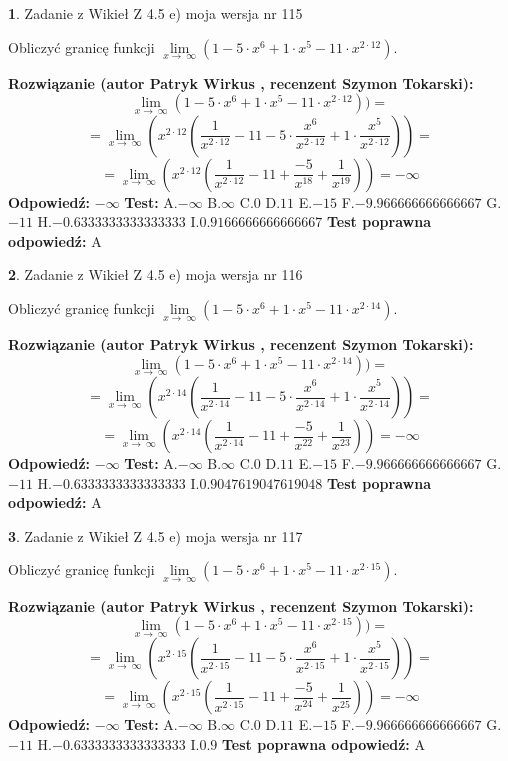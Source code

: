 \documentclass[12pt, a4paper]{article}
\theoremstyle{definition} %
\newtheorem{zad}{}
\newcommand{\zadStart}[1]{\begin{zad}#1\newline}
\newcommand{\zadStop}{\end{zad}}
\newcommand{\rozwStart}[2]{\noindent \textbf{Rozwiązanie (autor #1 , recenzent #2): }\newline}
\newcommand{\rozwStop}{\newline}
\newcommand{\odpStart}{\noindent \textbf{Odpowiedź:}\newline}
\newcommand{\odpStop}{\newline}
\newcommand{\testStart}{\noindent \textbf{Test:}\newline}
\newcommand{\testStop}{\newline}
\newcommand{\kluczStart}{\noindent \textbf{Test poprawna odpowiedź:}\newline}
\newcommand{\kluczStop}{\newline}
\begin{document}
\zadStart{Zadanie z Wikieł Z 4.5 e) moja wersja nr 115}


Obliczyć granicę funkcji  $\lim\limits_{x\to\ \infty}(1 - 5 \cdot x^{6}+1 \cdot x^{5}- 11 \cdot x^{2\cdot12})$.
\zadStop
\rozwStart{Patryk Wirkus}{Szymon Tokarski}
$$\lim\limits_{x\to\ \infty}(1 - 5 \cdot x^{6}+1 \cdot x^{5}- 11 \cdot x^{2\cdot12}))=$$
$$=\lim\limits_{x\to\ \infty}(x^{2\cdot12}(\frac{1}{x^{2\cdot12}}-11 -5 \cdot \frac{x^{6}}{x^{2\cdot12}}+1 \cdot \frac{x^{5}}{x^{2\cdot12}}))=$$
$$=\lim\limits_{x\to\ \infty}(x^{2\cdot12}(\frac{1}{x^{2\cdot12}}-11 + \frac{-5}{x^{18}}+ \frac{1}{x^{19}}))=-\infty$$
\rozwStop
\odpStart
$-\infty$
\odpStop
\testStart
A.$-\infty$ B.$\infty$ C.$0$ D.$11$ E.$-15$
F.$-9.966666666666667$ G.$-11$
H.$-0.6333333333333333$
I.$0.9166666666666667$
\testStop
\kluczStart
A
\kluczStop



\zadStart{Zadanie z Wikieł Z 4.5 e) moja wersja nr 116}


Obliczyć granicę funkcji  $\lim\limits_{x\to\ \infty}(1 - 5 \cdot x^{6}+1 \cdot x^{5}- 11 \cdot x^{2\cdot14})$.
\zadStop
\rozwStart{Patryk Wirkus}{Szymon Tokarski}
$$\lim\limits_{x\to\ \infty}(1 - 5 \cdot x^{6}+1 \cdot x^{5}- 11 \cdot x^{2\cdot14}))=$$
$$=\lim\limits_{x\to\ \infty}(x^{2\cdot14}(\frac{1}{x^{2\cdot14}}-11 -5 \cdot \frac{x^{6}}{x^{2\cdot14}}+1 \cdot \frac{x^{5}}{x^{2\cdot14}}))=$$
$$=\lim\limits_{x\to\ \infty}(x^{2\cdot14}(\frac{1}{x^{2\cdot14}}-11 + \frac{-5}{x^{22}}+ \frac{1}{x^{23}}))=-\infty$$
\rozwStop
\odpStart
$-\infty$
\odpStop
\testStart
A.$-\infty$ B.$\infty$ C.$0$ D.$11$ E.$-15$
F.$-9.966666666666667$ G.$-11$
H.$-0.6333333333333333$
I.$0.9047619047619048$
\testStop
\kluczStart
A
\kluczStop



\zadStart{Zadanie z Wikieł Z 4.5 e) moja wersja nr 117}


Obliczyć granicę funkcji  $\lim\limits_{x\to\ \infty}(1 - 5 \cdot x^{6}+1 \cdot x^{5}- 11 \cdot x^{2\cdot15})$.
\zadStop
\rozwStart{Patryk Wirkus}{Szymon Tokarski}
$$\lim\limits_{x\to\ \infty}(1 - 5 \cdot x^{6}+1 \cdot x^{5}- 11 \cdot x^{2\cdot15}))=$$
$$=\lim\limits_{x\to\ \infty}(x^{2\cdot15}(\frac{1}{x^{2\cdot15}}-11 -5 \cdot \frac{x^{6}}{x^{2\cdot15}}+1 \cdot \frac{x^{5}}{x^{2\cdot15}}))=$$
$$=\lim\limits_{x\to\ \infty}(x^{2\cdot15}(\frac{1}{x^{2\cdot15}}-11 + \frac{-5}{x^{24}}+ \frac{1}{x^{25}}))=-\infty$$
\rozwStop
\odpStart
$-\infty$
\odpStop
\testStart
A.$-\infty$ B.$\infty$ C.$0$ D.$11$ E.$-15$
F.$-9.966666666666667$ G.$-11$
H.$-0.6333333333333333$
I.$0.9$
\testStop
\kluczStart
A
\kluczStop
\end{document}
